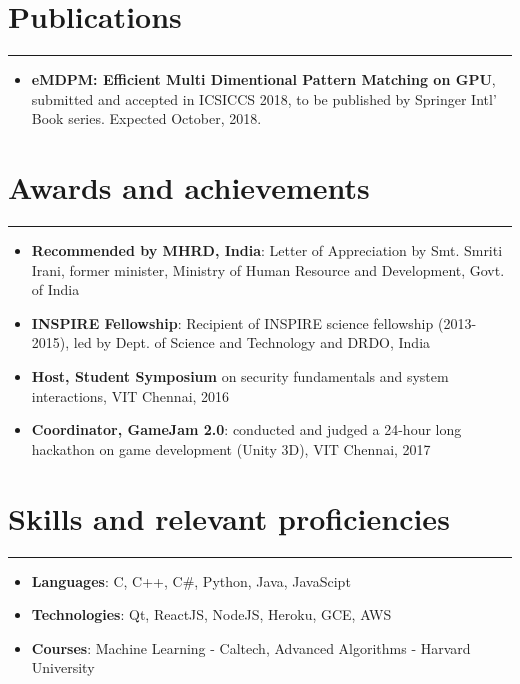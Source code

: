 \documentclass[10pt, a4paper]{article}
\begin{document}
\section*{Publications}
\vspace{-8px}
\hrule
\vspace{8px}
\begin{itemize}
	\item \textbf{eMDPM: Efficient Multi Dimentional Pattern Matching on GPU}, submitted and accepted in ICSICCS 2018, to be published by Springer Intl' Book series. Expected October, 2018.
\end{itemize}

\section*{Awards and achievements}
\vspace{-8px}
\hrule
\vspace{8px}
\begin{itemize}
	\item \textbf{Recommended by MHRD, India}: Letter of Appreciation by Smt. Smriti Irani, former minister, Ministry of Human Resource and Development, Govt. of India
	\item \textbf{INSPIRE Fellowship}: Recipient of INSPIRE science fellowship (2013-2015), led by Dept. of Science and Technology and DRDO, India
	\item \textbf{Host, Student Symposium} on security fundamentals and system interactions, VIT Chennai, 2016
	\item \textbf{Coordinator, GameJam 2.0}: conducted and judged a 24-hour long hackathon on game development (Unity 3D), VIT Chennai, 2017
\end{itemize}

\section*{Skills and relevant proficiencies}
\vspace{-8px}
\hrule
\vspace{8px}
\begin{itemize}
	\item \textbf{Languages}: C, C++, C#, Python, Java, JavaScipt
	\item \textbf{Technologies}: Qt, ReactJS, NodeJS, Heroku, GCE, AWS
	\item \textbf{Courses}: Machine Learning - Caltech, Advanced Algorithms - Harvard University
\end{itemize}
\end{document}
